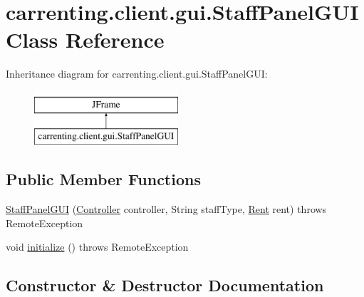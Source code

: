 \hypertarget{classcarrenting_1_1client_1_1gui_1_1_staff_panel_g_u_i}{}\section{carrenting.\+client.\+gui.\+Staff\+Panel\+G\+UI Class Reference}
\label{classcarrenting_1_1client_1_1gui_1_1_staff_panel_g_u_i}
Inheritance diagram for carrenting.\+client.\+gui.\+Staff\+Panel\+G\+UI\+:\begin{figure}[H]
\begin{center}
\leavevmode
\includegraphics[height=2.000000cm]{classcarrenting_1_1client_1_1gui_1_1_staff_panel_g_u_i}
\end{center}
\end{figure}
\subsection*{Public Member Functions}
\begin{DoxyCompactItemize}
\item 
\mbox{\hyperlink{classcarrenting_1_1client_1_1gui_1_1_staff_panel_g_u_i_a0731d4c14dfd42839e75af5007c93648}{Staff\+Panel\+G\+UI}} (\mbox{\hyperlink{classcarrenting_1_1client_1_1_controller}{Controller}} controller, String staff\+Type, \mbox{\hyperlink{classcarrenting_1_1server_1_1jdo_1_1_rent}{Rent}} rent)  throws Remote\+Exception
\item 
void \mbox{\hyperlink{classcarrenting_1_1client_1_1gui_1_1_staff_panel_g_u_i_aa2e22ff26b5539e2f2b4fdaf3e948802}{initialize}} ()  throws Remote\+Exception 
\end{DoxyCompactItemize}


\subsection{Constructor \& Destructor Documentation}
\mbox{\label{classcarrenting_1_1client_1_1gui_1_1_staff_panel_g_u_i_a0731d4c14dfd42839e75af5007c93648}} 
